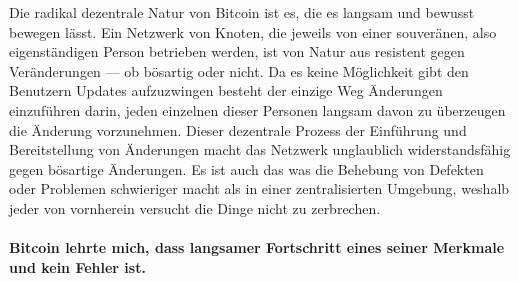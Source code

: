 Die radikal dezentrale Natur von Bitcoin ist es, die es langsam und bewusst
bewegen lässt. Ein Netzwerk von Knoten, die jeweils von einer souveränen, also
eigenständigen Person betrieben werden, ist von Natur aus resistent gegen
Veränderungen — ob bösartig oder nicht. Da es keine Möglichkeit gibt den
Benutzern Updates aufzuzwingen besteht der einzige Weg Änderungen einzuführen
darin, jeden einzelnen dieser Personen langsam davon zu überzeugen die Änderung
vorzunehmen. Dieser dezentrale Prozess der Einführung und Bereitstellung von
Änderungen macht das Netzwerk unglaublich widerstandsfähig gegen bösartige
Änderungen. Es ist auch das was die Behebung von Defekten oder Problemen
schwieriger macht als in einer zentralisierten Umgebung, weshalb jeder von
vornherein versucht die Dinge nicht zu zerbrechen.

\paragraph{Bitcoin lehrte mich, dass langsamer Fortschritt eines seiner Merkmale
und kein Fehler ist.}

%
%
%
%
%
%
%
